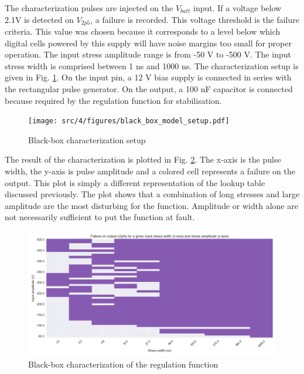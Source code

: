 The characterization pulses are injected on the $V_{batt}$ input.
If a voltage below 2.1V is detected on $V_{2p5}$, a failure is recorded.
This voltage threshold is the failure criteria.
This value was chosen because it corresponds to a level below which digital cells powered by this supply will have noise margins too small for proper operation.
The input stress amplitude range is from -50 V to -500 V.
The input stress width is comprised between 1 ns and 1000 ns.
The characterization setup is given in Fig. \ref{fig:cz-black-box-setup}.
On the input pin, a 12 V bias supply is connected in series with the rectangular pulse generator.
On the output, a 100 nF capacitor is connected because required by the regulation function for stabilisation.

\begin{figure}[!h]
  \centering
  \texttt{[image: src/4/figures/black\_box\_model\_setup.pdf]}
  \caption{Black-box characterization setup}
  \label{fig:cz-black-box-setup}
\end{figure}

The result of the characterization is plotted in Fig. \ref{fig:cz-black-box}.
The x-axis is the pulse width, the y-axis is pulse amplitude and a colored cell represents a failure on the output.
This plot is simply a different representation of the lookup table discussed previously.
The plot shows that a combination of long stresses and large amplitude are the most disturbing for the function.
Amplitude or width alone are not necessarily sufficient to put the function at fault.

\begin{figure}[!h]
  \centering
  \includegraphics[width=\textwidth]{src/4/figures/black_box_regulator.png}
  \caption{Black-box characterization of the regulation function}
  \label{fig:cz-black-box}
\end{figure}

